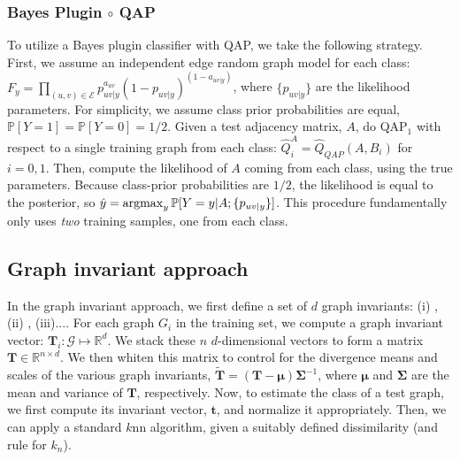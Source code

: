 \documentclass{article} %
\newcommand{\argmax}{\operatornamewithlimits{argmax}}
\newcommand{\PP}{\mathbb{P}}           %
\providecommand{\mc}[1]{\mathcal{#1}}
\providecommand{\mb}[1]{\boldsymbol{#1}}
\providecommand{\mh}[1]{\hat{#1}}
\providecommand{\mtb}[1]{\widetilde{\boldsymbol{#1}}}
\newcommand{\Real}{\mathbb{R}}
\begin{document}


\subsubsection{Bayes Plugin $\circ$ QAP} %
\label{ssub:bayes_plugin_circ_qap}


To utilize a Bayes plugin classifier with QAP, we take the following strategy.  First, we assume an independent edge random graph model for each class: $F_y=\prod_{(u,v) \in \mc{E}}p_{uv|y}^{a_{uv}} (1-p_{uv|y})^{(1-a_{uv|y})}$, where $\{p_{uv|y}\}$ are the likelihood parameters.  For simplicity, we assume class prior probabilities are equal, $\PP[Y=1]=\PP[Y=0]=1/2$.  Given a test adjacency matrix, $A$,  do QAP$_1$ with respect to a single training graph from each class: $\mh{Q}_i^A=\mh{Q}_{QAP}(A,B_i)$ for $i=0,1$.  Then, compute the likelihood of $A$ coming from each class, using the true parameters.  Because class-prior probabilities are $1/2$, the likelihood is equal to the posterior, so $\mh{y}=\argmax_y \PP[Y=y | A; \{p_{uv|y}\}]$. This procedure fundamentally only uses \emph{two} training samples, one from each class.



\subsection{Graph invariant approach} %
\label{sub:graph_invariant_approach}

In the graph invariant approach, we first define a set of $d$ graph invariants: (i) , (ii) , (iii)....  For each graph $G_i$ in the training set, we compute a graph invariant vector: $\mb{T}_i: \mc{G} \mapsto \Real^d$.  We stack these $n$ $d$-dimensional vectors to form a matrix $\mb{T} \in \Real^{n \times d}$. We then whiten this matrix to control for the divergence means and scales of the various graph invariants, $\mtb{T}=(\mb{T}-\mb{\mu}) \mb{\Sigma}^{-1}$, where $\mb{\mu}$ and $\mb{\Sigma}$ are the mean and variance of $\mb{T}$, respectively.  Now, to estimate the class of a test graph, we first compute its invariant vector, $\mb{t}$, and normalize it appropriately.  Then, we can apply a standard $k$nn algorithm, given a suitably defined dissimilarity (and rule for $k_n$).


\end{document}
